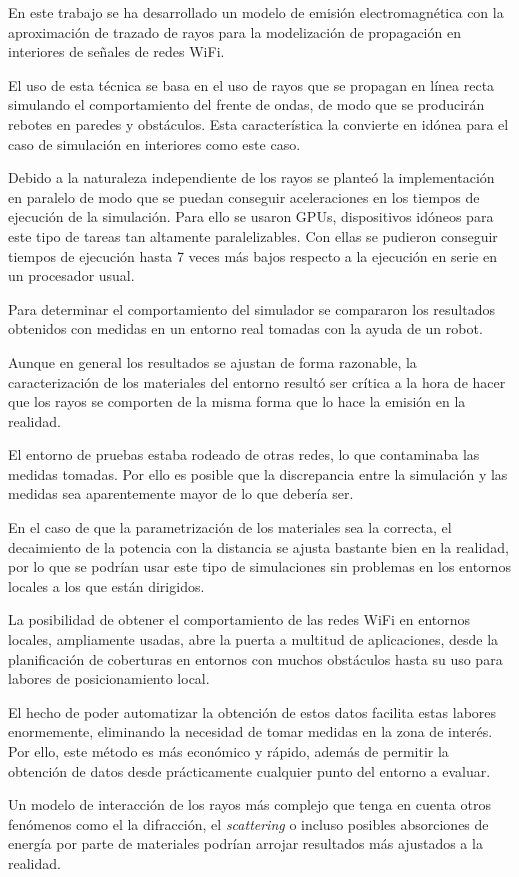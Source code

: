 En este trabajo se ha desarrollado un modelo de emisión electromagnética con la aproximación de trazado de rayos para la modelización de propagación en interiores de señales de redes WiFi.

El uso de esta técnica se basa en el uso de rayos que se propagan en línea recta simulando el comportamiento del frente de ondas, de modo que se producirán rebotes en paredes y obstáculos.
Esta característica la convierte en idónea para el caso de simulación en interiores como este caso.

Debido a la naturaleza independiente de los rayos se planteó la implementación en paralelo de modo que se puedan conseguir aceleraciones en los tiempos de ejecución de la simulación.
Para ello se usaron GPUs, dispositivos idóneos para este tipo de tareas tan altamente paralelizables.
Con ellas se pudieron conseguir tiempos de ejecución hasta 7 veces más bajos respecto a la ejecución en serie en un procesador usual.

Para determinar el comportamiento del simulador se compararon los resultados obtenidos con medidas en un entorno real tomadas con la ayuda de un robot.

Aunque en general los resultados se ajustan de forma razonable, la caracterización de los materiales del entorno resultó ser crítica a la hora de hacer que los rayos se comporten de la misma forma que lo hace la emisión en la realidad.

El entorno de pruebas estaba rodeado de otras redes, lo que contaminaba las medidas tomadas.
Por ello es posible que la discrepancia entre la simulación y las medidas sea aparentemente mayor de lo que debería ser.

En el caso de que la parametrización de los materiales sea la correcta, el decaimiento de la potencia con la distancia se ajusta bastante bien en la realidad, por lo que se podrían usar este tipo de simulaciones sin problemas en los entornos locales a los que están dirigidos.

La posibilidad de obtener el comportamiento de las redes WiFi en entornos locales, ampliamente usadas, abre la puerta a multitud de aplicaciones, desde la planificación de coberturas en entornos con muchos obstáculos hasta su uso para labores de posicionamiento local.

El hecho de poder automatizar la obtención de estos datos facilita estas labores enormemente, eliminando la necesidad de tomar medidas en la zona de interés.
Por ello, este método es más económico y rápido, además de permitir la obtención de datos desde prácticamente cualquier punto del entorno a evaluar.

Un modelo de interacción de los rayos más complejo que tenga en cuenta otros fenómenos como el la difracción, el \textit{scattering} o incluso posibles absorciones de energía por parte de materiales podrían arrojar resultados más ajustados a la realidad.